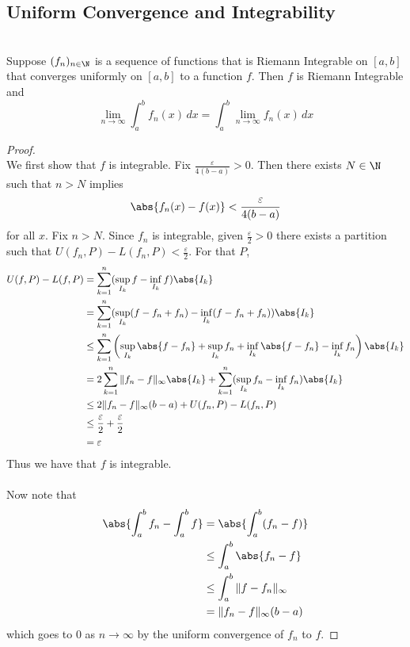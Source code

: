 \documentclass[a4paper]{article}
\begin{document}
\subsection{Uniform Convergence and Integrability}
\begin{thm}{}{}\\ Suppose $(f_n)_{n\in\N}$ is a sequence of functions that is Riemann Integrable on $[a,b]$ that converges uniformly on $[a,b]$ to a function $f$. Then $f$ is Riemann Integrable and $$\lim_{n\to\infty}\int_a^bf_n(x)\,dx=\int_a^b\lim_{n\to\infty}f_n(x)\,dx$$ 
\begin{proof}\\ We first show that $f$ is integrable. Fix $\frac{\varepsilon}{4(b-a)}>0$. Then there exists $N\in\N$ such that $n>N$ implies $$\abs{f_n(x)-f(x)}<\frac{\varepsilon}{4(b-a)}$$ for all $x$. Fix $n>N$. Since $f_n$ is integrable, given $\frac{\varepsilon}{2}>0$ there exists a partition such that $U(f_n,P)-L(f_n,P)<\frac{\varepsilon}{2}$. For that $P$,
\begin{align*}
U(f,P)-L(f,P)&=\sum_{k=1}^n(\sup_{I_k}f-\inf_{I_k}f)\abs{I_k}\\
&=\sum_{k=1}^n(\sup_{I_k}(f-f_n+f_n)-\inf_{I_k}(f-f_n+f_n))\abs{I_k}\\
&\leq\sum_{k=1}^n\left(\sup_{I_k}\abs{f-f_n}+\sup_{I_k}f_n+\inf_{I_k}\abs{f-f_n}-\inf_{I_k}f_n\right)\abs{I_k}\\
&=2\sum_{k=1}^n\|f_n-f\|_\infty\abs{I_k}+\sum_{k=1}^n(\sup_{I_k}f_n-\inf_{I_k}f_n)\abs{I_k}\\
&\leq 2\|f_n-f\|_\infty(b-a)+U(f_n,P)-L(f_n,P)\\
&\leq\frac{\varepsilon}{2}+\frac{\varepsilon}{2}\\
&=\varepsilon
\end{align*}
Thus we have that $f$ is integrable. 
\\~\\
Now note that
\begin{align*}
\abs{\int_a^bf_n-\int_a^bf}&=\abs{\int_a^b(f_n-f)}\\
&\leq\int_a^b\abs{f_n-f}\\
&\leq\int_a^b\|f-f_n\|_\infty\\
&=\|f_n-f\|_\infty(b-a)
\end{align*}
which goes to $0$ as $n\to\infty$ by the uniform convergence of $f_n$ to $f$. 
\end{proof}
\end{thm}
\end{document}
